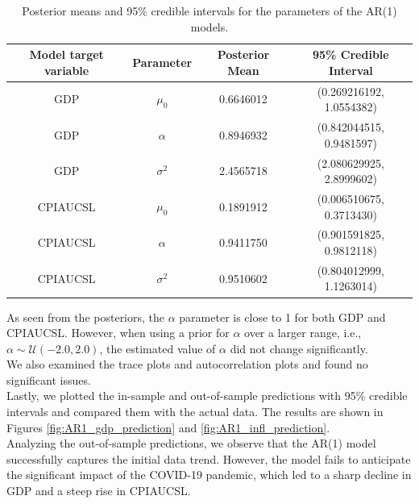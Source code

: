 \begin{table}[H]
    \centering
    \begin{tabular}{|c|c|c|c|}
        \hline
        \textbf{Model target variable } & \textbf{Parameter } & \textbf{Posterior Mean } & \textbf{95\% Credible Interval } \\
        \hline
        GDP      & $\mu_0$    & 0.6646012 & (0.269216192, 1.0554382) \\
        GDP      & $\alpha$   & 0.8946932 & (0.842044515, 0.9481597) \\
        GDP      & $\sigma^2$ & 2.4565718 & (2.080629925, 2.8999602) \\
        CPIAUCSL & $\mu_0$    & 0.1891912 & (0.006510675, 0.3713430) \\
        CPIAUCSL & $\alpha$   & 0.9411750 & (0.901591825, 0.9812118) \\
        CPIAUCSL & $\sigma^2$ & 0.9510602 & (0.804012999, 1.1263014) \\
        \hline
    \end{tabular}
    \caption{Posterior means and 95\% credible intervals for the parameters of the AR(1) models.}
    \label{tab:AR1_posteriors}
\end{table}
As seen from the posteriors, the $\alpha$ parameter is close to 1 for both GDP and CPIAUCSL. However, when using a prior for $\alpha$ over a larger range, i.e., $\alpha \sim \mathcal{U}(-2.0, 2.0)$, the estimated value of $\alpha$ did not change significantly. \\
We also examined the trace plots and autocorrelation plots and found no significant issues. \\
Lastly, we plotted the in-sample and out-of-sample predictions with 95\% credible intervals and compared them with the actual data. The results are shown in Figures \ref{fig:AR1_gdp_prediction} and \ref{fig:AR1_infl_prediction}. \\
Analyzing the out-of-sample predictions, we observe that the AR(1) model successfully captures the initial data trend. However, the model fails to anticipate the significant impact of the COVID-19 pandemic, which led to a sharp decline in GDP and a steep rise in CPIAUCSL. \\
